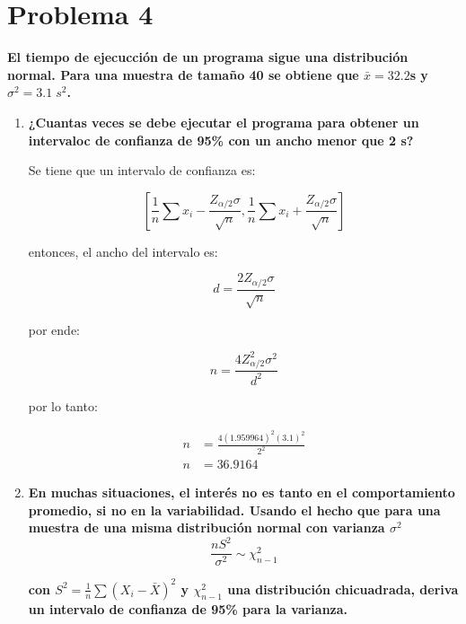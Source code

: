 \section*{Problema 4}

\textbf{El tiempo de ejecucción de un programa sigue una distribución normal. Para una muestra de tamaño 40 se obtiene que $\bar{x}=32.2$s y $\sigma^2=3.1\; s^2$.}

\begin{enumerate}
    \item \textbf{¿Cuantas veces se debe ejecutar el programa para obtener un intervaloc de confianza de 95\% con un ancho menor que 2 s?}

          Se tiene que un intervalo de confianza es:

          \begin{equation*}
              \left [ \frac{1}{n} \sum x_i - \frac{Z_{\alpha/2}\sigma}{\sqrt{n}},\frac{1}{n} \sum x_i + \frac{Z_{\alpha/2}\sigma}{\sqrt{n}} \right ]
          \end{equation*}

          entonces, el ancho del intervalo es:

          \begin{equation*}
              d = \frac{2Z_{\alpha/2}\sigma}{\sqrt{n}}
          \end{equation*}

          por ende:

          \begin{equation*}
              n = \frac{4Z_{\alpha/2}^2\sigma^2}{d^2}
          \end{equation*}

          por lo tanto:

          \begin{align*}
              n & = \frac{4(1.959964)^2(3.1)^2}{2^2} \\
              n & = 36.9164
          \end{align*}

    \item \textbf{En muchas situaciones, el interés no es tanto en el comportamiento promedio, si no en la variabilidad. Usando el hecho que para una muestra de una misma distribución normal con varianza $\sigma^2$}
          \begin{equation*}
              \frac{nS^2}{\sigma^2} \sim \chi_{n-1}^2
          \end{equation*}

          \textbf{con $S^2 = \frac{1}{n}\sum (X_i-\bar{X})^2$ y $\chi_{n-1}^2$ una distribución chicuadrada, deriva un intervalo de confianza de 95\% para la varianza.}
\end{enumerate}